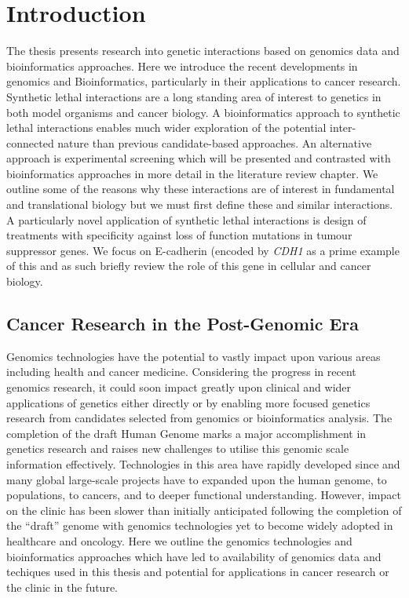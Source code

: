 \chapter{Introduction}
\label{chap:intro}



The thesis presents research into genetic interactions based on genomics data and bioinformatics approaches. Here we introduce the recent developments in genomics and Bioinformatics, particularly in their applications to cancer research. Synthetic lethal interactions are a long standing area of interest to genetics in both model organisms and cancer biology. A bioinformatics approach to synthetic lethal interactions enables much wider exploration of the potential inter-connected nature than previous candidate-based approaches. An alternative approach is experimental screening which will be presented and contrasted with bioinformatics approaches in more detail in the literature review chapter. We outline some of the reasons why these interactions are of interest in fundamental and translational biology but we must first define these and similar interactions. A particularly novel application of synthetic lethal interactions is design of treatments with specificity against loss of function mutations in tumour suppressor genes. We focus on E-cadherin (encoded by \textit{CDH1} as a prime example of this and as such briefly review the role of this gene in cellular and cancer biology.   



\section{Cancer Research in the Post-Genomic Era}

Genomics technologies have the potential to vastly impact upon various areas including health and cancer medicine. Considering the progress in recent genomics research, it could soon impact greatly upon clinical and wider applications of genetics either directly or by enabling more focused genetics research from candidates selected from genomics or bioinformatics analysis. The completion of the draft Human Genome marks a major accomplishment in genetics research and raises new challenges to utilise this genomic scale information effectively. Technologies in this area have rapidly developed since and many global large-scale projects have to expanded upon the human genome, to populations, to cancers, and to deeper functional understanding. However, impact on the clinic has been slower than initially anticipated following the completion of the ``draft'' genome with genomics technologies yet to become widely adopted in healthcare and oncology. Here we outline the genomics technologies and bioinformatics approaches which have led to availability of genomics data and techiques used in this thesis and potential for applications in cancer research or the clinic in the future. 

